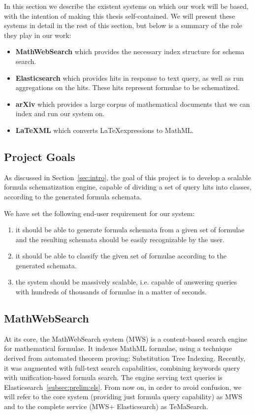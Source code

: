 \documentclass[a4paper,11pt,oneside]{article}
\def\MWS{\textsf{MWS}\xspace}
\def\mws{\textsf{MathWebSearch}\xspace}
\def\tms{\textsf{TeMaSearch}\xspace}
\def\els{\textsf{Elasticsearch}\xspace}
\def\latexml{\LaTeX{ML}\xspace}
\def\latex{\LaTeX}
\begin{document}
In this section we describe the existent systems on which our work will be
based, with the intention of making this thesis self-contained. We will
present these systems in detail in the rest of this section, but
below is a summary of the role they play in our work:
\begin{itemize}
\item \textbf{MathWebSearch} which provides the necessary index structure
for schema search.
\item \textbf{Elasticsearch} which provides hits in response to text query,
    as well as run aggregations on the hits.
    These hits represent formulae to be schematized.
\item \textbf{arXiv} which provides a large corpus of mathematical documents
    that we can index and run our system on.
\item \textbf{\latexml} which converts \latex expressions to MathML.
\end{itemize}

\subsection{Project Goals}\label{subsec:prelim:goals}
As discussed in Section~\ref{sec:intro}, the goal of this project is to
develop a scalable formula schematization engine, capable of dividing a set of
query hits into classes, according to the generated formula schemata.

We have set the following end-user requirement for our system:
\begin{enumerate}
    \item it should be able to generate formula schemata from a
        given set of formulae and the resulting schemata should be easily
        recognizable by the user.
    \item it should be able to classify the given set of formulae according to
        the generated schemata.
    \item the system should be massively scalable, i.e. capable of answering
        queries with hundreds of thousands of formulae in a matter of seconds.
\end{enumerate}

\subsection{MathWebSearch}\label{subsec:prelim:mws}

At its core, the \mws system (MWS) is a content-based search engine for
mathematical formulae. It indexes MathML formulae, using a technique derived
from automated theorem proving: Substitution Tree Indexing.
Recently, it was augmented with full-text search capabilities, combining
keywords query with unification-based formula search. The engine serving
text queries is \els~\ref{subsec:prelim:els}.
From now on, in order to avoid confusion, we will refer to the core system
(providing just formula query capability) as \MWS and to the complete service
(\MWS + \els) as \tms.
\end{document}
